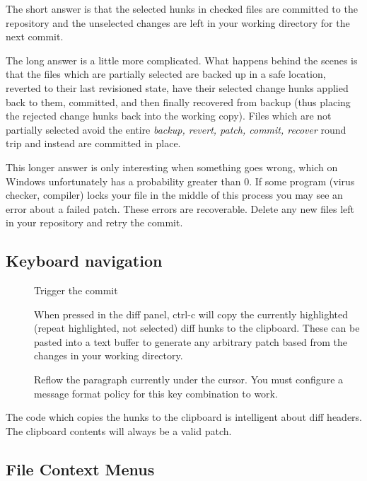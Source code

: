 \documentclass[letterpaper,10pt,english]{manual}
\begin{document}
The short answer is that the selected hunks in checked files are
committed to the repository and the unselected changes are left in your
working directory for the next commit.

The long answer is a little more complicated.  What happens behind the
scenes is that the files which are partially selected are backed up in a
safe location, reverted to their last revisioned state, have their
selected change hunks applied back to them, committed, and then finally
recovered from backup (thus placing the rejected change hunks back into
the working copy).  Files which are not partially selected avoid the
entire \emph{backup, revert, patch, commit, recover} round trip and instead
are committed in place.

This longer answer is only interesting when something goes wrong, which
on Windows unfortunately has a probability greater than 0. If some
program (virus checker, compiler) locks your file in the middle of this
process you may see an error about a failed patch.  These errors are
recoverable.  Delete any new  files left in your repository
and retry the commit.


\subsection{Keyboard navigation}
\begin{description}
\item[]
Trigger the commit

\item[]
When pressed in the diff panel, ctrl-c will copy the currently
highlighted (repeat highlighted, not selected) diff hunks to the
clipboard. These can be pasted into a text buffer to generate any
arbitrary patch based from the changes in your working directory.

\item[]
Reflow the paragraph currently under the cursor.  You must configure
a message format policy for this key combination to work.

\end{description}

The code which copies the hunks to the clipboard is intelligent about
diff headers.  The clipboard contents will always be a valid patch.


\subsection{File Context Menus}
\end{document}
